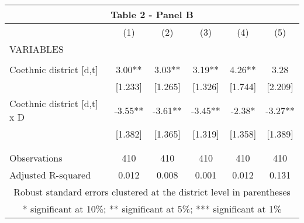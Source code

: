 \begin{tabular}{lccccc}
\multicolumn{6}{c}{Table 2 - Panel B} \\ \hline
 & (1) & (2) & (3) & (4) & (5) \\
VARIABLES &  &  &  &  &  \\ \hline
 &  &  &  &  &  \\
Coethnic district [d,t] & 3.00** & 3.03** & 3.19** & 4.26** & 3.28 \\
 & [1.233] & [1.265] & [1.326] & [1.744] & [2.209] \\
Coethnic district [d,t] x D & -3.55** & -3.61** & -3.45** & -2.38* & -3.27** \\
 & [1.382] & [1.365] & [1.319] & [1.358] & [1.389] \\
 &  &  &  &  &  \\
 &  &  &  &  &  \\
Observations & 410 & 410 & 410 & 410 & 410 \\
 Adjusted R-squared & 0.012 & 0.008 & 0.001 & 0.012 & 0.131 \\ \hline
\multicolumn{6}{c}{ Robust standard errors clustered at the district level in parentheses} \\
\multicolumn{6}{c}{ * significant at 10\%; ** significant at 5\%; *** significant at 1\%} \\
\end{tabular}
